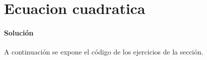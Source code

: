 \section{Ecuacion cuadratica}

  \paragraph{Solución}
  A continuación se expone el código de los ejercicios de la sección.
  
  
